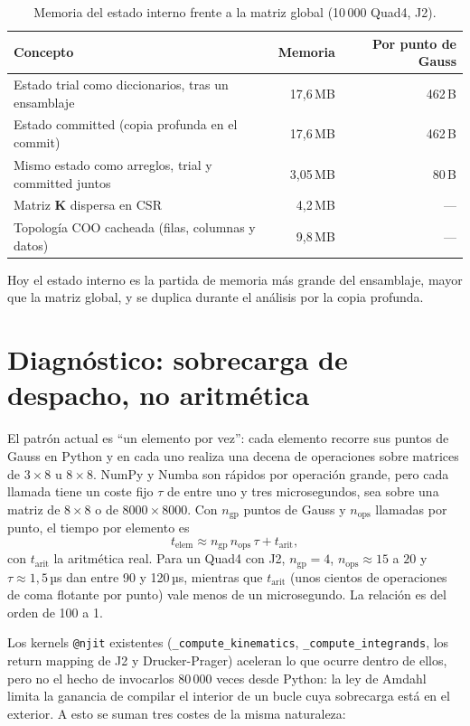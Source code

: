 \documentclass[11pt,letterpaper,oneside]{article}
\newcommand{\code}[1]{\texttt{#1}}
\begin{document}
\begin{table}[h]
\centering
\small
\begin{tabular}{lrr}
\toprule
Concepto & Memoria & Por punto de Gauss \\
\midrule
Estado trial como diccionarios, tras un ensamblaje & 17,6\,MB & 462\,B \\
Estado committed (copia profunda en el commit) & 17,6\,MB & 462\,B \\
Mismo estado como arreglos, trial y committed juntos & 3,05\,MB & 80\,B \\
Matriz $\mathbf K$ dispersa en CSR & 4,2\,MB & --- \\
Topología COO cacheada (filas, columnas y datos) & 9,8\,MB & --- \\
\bottomrule
\end{tabular}
\caption{Memoria del estado interno frente a la matriz global (10\,000 Quad4, J2).}
\label{tab:memoria}
\end{table}

Hoy el estado interno es la partida de memoria más grande del ensamblaje, mayor que la matriz global, y se duplica durante el análisis por la copia profunda.

\section{Diagnóstico: sobrecarga de despacho, no aritmética}

El patrón actual es ``un elemento por vez'': cada elemento recorre sus puntos de Gauss en Python y en cada uno realiza una decena de operaciones sobre matrices de $3\times8$ u $8\times8$. NumPy y Numba son rápidos por operación grande, pero cada llamada tiene un coste fijo $\tau$ de entre uno y tres microsegundos, sea sobre una matriz de $8\times8$ o de $8000\times8000$. Con $n_{\text{gp}}$ puntos de Gauss y $n_{\text{ops}}$ llamadas por punto, el tiempo por elemento es
\begin{equation}
  t_{\text{elem}} \approx n_{\text{gp}}\, n_{\text{ops}}\, \tau + t_{\text{arit}},
\end{equation}
con $t_{\text{arit}}$ la aritmética real. Para un Quad4 con J2, $n_{\text{gp}} = 4$, $n_{\text{ops}} \approx 15$ a $20$ y $\tau \approx 1{,}5$\,µs dan entre 90 y 120\,µs, mientras que $t_{\text{arit}}$ (unos cientos de operaciones de coma flotante por punto) vale menos de un microsegundo. La relación es del orden de 100 a 1.

Los kernels \code{@njit} existentes (\code{\_compute\_kinematics}, \code{\_compute\_integrands}, los return mapping de J2 y Drucker-Prager) aceleran lo que ocurre dentro de ellos, pero no el hecho de invocarlos 80\,000 veces desde Python: la ley de Amdahl limita la ganancia de compilar el interior de un bucle cuya sobrecarga está en el exterior. A esto se suman tres costes de la misma naturaleza:
\end{document}
